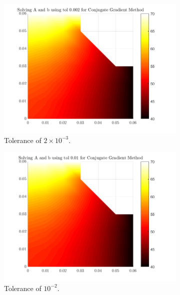 \documentclass[12pt,a4paper]{article}
\begin{document}
\begin{figure}[H]
\begin{subfigure}[b]{0.48\textwidth}
		\centering
		\includegraphics[width=\linewidth]{images/ConjugateComparisontol0-002.png}
		\caption{Tolerance of $2 \times 10^{-3}$.}
		\label{fig:Conjugatetol0.002}
	\end{subfigure}
	\hfill
	\begin{subfigure}[b]{0.48\textwidth}
		\centering
		\includegraphics[width=\linewidth]{images/ConjugateComparisontol0-01.png}
		\caption{Tolerance of $10^{-2}$.}
		\label{fig:Conjugatetol0.01}
	\end{subfigure}
	\hfill
	\begin{subfigure}[b]{0.48\textwidth}
		\centering

\end{subfigure}
\end{figure}
\end{document}
